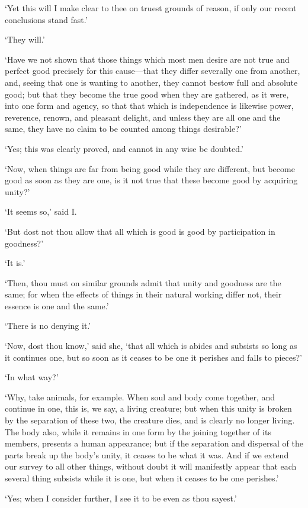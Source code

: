 \documentclass[12pt]{book}
\begin{document}
`Yet this will I make clear to thee on truest grounds of reason, if only
our recent conclusions stand fast.'

`They will.'

`Have we not shown that those things which most men desire are not true
and perfect good precisely for this cause---that they differ severally
one from another, and, seeing that one is wanting to another, they
cannot bestow full and absolute good; but that they become the true good
when they are gathered, as it were, into one form and agency, so that
that which is independence is likewise power, reverence, renown, and
pleasant delight, and unless they are all one and the same, they have no
claim to be counted among things desirable?'

`Yes; this was clearly proved, and cannot in any wise be doubted.'

`Now, when things are far from being good while they are different, but
become good as soon as they are one, is it not true that these become
good by acquiring unity?'

`It seems so,' said I.

`But dost not thou allow that all which is good is good by participation
in goodness?'

`It is.'

`Then, thou must on similar grounds admit that unity and goodness are
the same; for when the effects of things in their natural working differ
not, their essence is one and the same.'

`There is no denying it.'

`Now, dost thou know,' said she, `that all which is abides and subsists
so long as it continues one, but so soon as it ceases to be one it
perishes and falls to pieces?'

`In what way?'

`Why, take animals, for example. When soul and body come together, and
continue in one, this is, we say, a living creature; but when this unity
is broken by the separation of these two, the creature dies, and is
clearly no longer living. The body also, while it remains in one form by
the joining together of its members, presents a human appearance; but if
the separation and dispersal of the parts break up the body's unity, it
ceases to be what it was. And if we extend our survey to all other
things, without doubt it will manifestly appear that each several thing
subsists while it is one, but when it ceases to be one perishes.'

`Yes; when I consider further, I see it to be even as thou sayest.'
\end{document}

